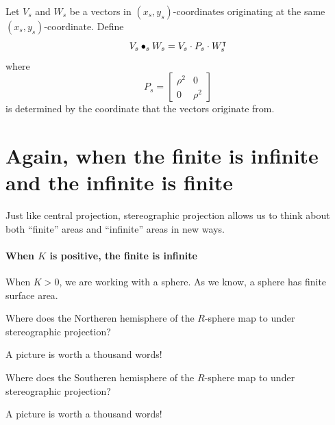 \documentclass{ximera}
\begin{document}
\begin{definition}
  Let $V_s$ and $W_s$ be a vectors in $(x_s,y_s)$-coordinates
  originating at the same $(x_s,y_s)$-coordinate. Define
  \[
  V_s \bullet_s W_s = V_s \cdot P_s \cdot W_s^\intercal
  \]
  where
  \[
  P_s =
  \begin{bmatrix}
    \rho^2 & 0\\
    0 & \rho^2
  \end{bmatrix}
  \]
  is determined by the coordinate that the vectors originate from.
\end{definition}








\section{Again, when the finite is infinite and the infinite is finite}

Just like central projection, stereographic projection allows us to
think about both ``finite'' areas and ``infinite'' areas in new ways.

\paragraph{When $K$ is positive, the finite is infinite}

When $K>0$, we are working with a sphere. As we know, a sphere has
finite surface area.



\begin{problem}
  Where does the Northeren hemisphere of the $R$-sphere map to under stereographic projection?
  \begin{hint}
    A picture is worth a thousand words!
  \end{hint}
  \begin{freeResponse}
  \end{freeResponse}
\end{problem}


\begin{problem}
  Where does the Southeren hemisphere of the $R$-sphere map to under stereographic projection?
  \begin{hint}
    A picture is worth a thousand words!
  \end{hint}
  \begin{freeResponse}
  \end{freeResponse}
\end{problem}
\end{document}

